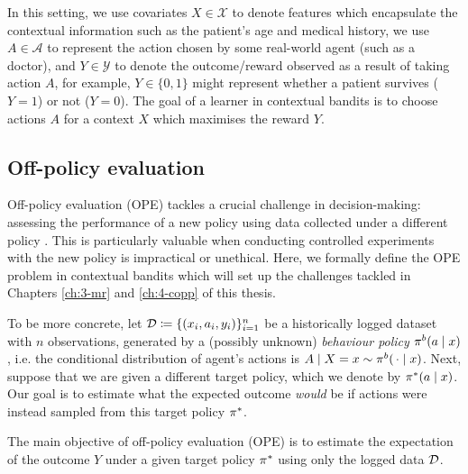 In this setting, we use covariates $X \in \mathcal{X}$ to denote features which encapsulate the contextual information such as the patient's age and medical history, we use $A \in \mathcal{A}$ to represent the action chosen by some real-world agent (such as a doctor), and $Y \in \mathcal{Y}$ to denote the outcome/reward observed as a result of taking action $A$, for example, $Y \in \{0, 1\}$ might represent whether a patient survives ($Y=1$) or not ($Y=0$). The goal of a learner in contextual bandits is to choose actions $A$ for a context $X$ which maximises the reward $Y$. 

\subsection{Off-policy evaluation}
Off-policy evaluation (OPE) tackles a crucial challenge in decision-making: assessing the performance of a new policy using data collected under a different policy \citep{swaminathan2015counterfactual, wang2017optimal, farajtabar2018more, su2019continuous, metelli2021subgaussian, liu2019triply, sugiyama2012machine, swaminathan2017off}. This is particularly valuable when conducting controlled experiments with the new policy is impractical or unethical. Here, we formally define the OPE problem in contextual bandits which will set up the challenges tackled in Chapters \ref{ch:3-mr} and \ref{ch:4-copp} of this thesis. 

To be more concrete, let $\mathcal{D}\coloneqq \{(x_i, a_i, y_i)\}_{i=1}^n$ be a historically logged dataset with $n$ observations, generated by a (possibly unknown) \emph{behaviour policy} $\pi^b(a\mid x)$, i.e. the conditional distribution of agent's actions is $A\mid X=x \sim \pi^b(\,\cdot\mid x)$.
Next, suppose that we are given a different target policy, which we denote by $\pi^*(a\mid x)$. Our goal is to estimate what the expected outcome \emph{would} be if actions were instead sampled from this target policy $\pi^*$.

\begin{importantresultwithtitle}[title=Off-policy evaluation (OPE)]\noindent
    The main objective of off-policy evaluation (OPE) is to estimate the expectation of the outcome $Y$ under a given target policy $\pi^*$ using only the logged data $\mathcal{D}$.
\end{importantresultwithtitle}

